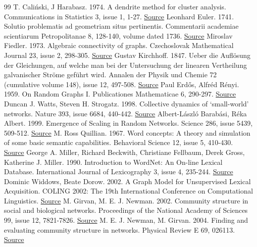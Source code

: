 \documentclass[10pt,letterpaper]{article}
\begin{document}
\begin{thebibliography}{99}
T. Caliński, J Harabasz. 1974. A dendrite method for cluster analysis. Communications in Statistics 3, issue 1, 1-27. \href{https://doi.org/10.1080/03610927408827101}{Source}
Leonhard Euler. 1741. Solutio problematis ad geometriam situs pertinentis. Commentarii academiae scientiarum Petropolitanae 8, 128-140, volume dated 1736. \href{https://scholarlycommons.pacific.edu/euler-works/53/}{Source}
Miroslav Fiedler. 1973. Algebraic connectivity of graphs. Czechoslovak Mathematical Journal 23, issue 2, 298-305. \href{https://doi.org/10.21136/cmj.1973.101168}{Source}
Gustav Kirchhoff. 1847. Ueber die Auflösung der Gleichungen, auf welche man bei der Untersuchung der linearen Vertheilung galvanischer Ströme geführt wird. Annalen der Physik und Chemie 72 (cumulative volume 148), issue 12, 497-508. \href{https://sites.math.rutgers.edu/~zeilberg/akherim/kirchoff1847.pdf}{Source}
Paul Erdős, Alfréd Rényi. 1959. On Random Graphs I. Publicationes Mathematicae 6, 290-297. \href{https://www.renyi.hu/~p_erdos/1959-11.pdf}{Source}
Duncan J. Watts, Steven H. Strogatz. 1998. Collective dynamics of ‘small-world’ networks. Nature 393, issue 6684, 440-442. \href{https://doi.org/10.1038/30918}{Source}
Albert-László Barabási, Réka Albert. 1999. Emergence of Scaling in Random Networks. Science 286, issue 5439, 509-512. \href{https://doi.org/10.1126/science.286.5439.509}{Source}
M. Ross Quillian. 1967. Word concepts: A theory and simulation of some basic semantic capabilities. Behavioral Science 12, issue 5, 410-430. \href{https://doi.org/10.1002/bs.3830120511}{Source}
George A. Miller, Richard Beckwith, Christiane Fellbaum, Derek Gross, Katherine J. Miller. 1990. Introduction to WordNet: An On-line Lexical Database. International Journal of Lexicography 3, issue 4, 235-244. \href{https://doi.org/10.1093/ijl/3.4.235}{Source}
Dominic Widdows, Beate Dorow. 2002. A Graph Model for Unsupervised Lexical Acquisition. COLING 2002: The 19th International Conference on Computational Linguistics. \href{https://aclanthology.org/C02-1114/}{Source}
M. Girvan, M. E. J. Newman. 2002. Community structure in social and biological networks. Proceedings of the National Academy of Sciences 99, issue 12, 7821-7826. \href{https://doi.org/10.1073/pnas.122653799}{Source}
M. E. J. Newman, M. Girvan. 2004. Finding and evaluating community structure in networks. Physical Review E 69, 026113. \href{https://arxiv.org/abs/cond-mat/0308217}{Source}

\end{thebibliography}
\end{document}

